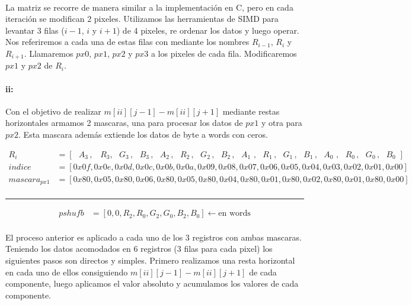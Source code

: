 \documentclass[a4paper]{article}
\begin{document}
\paragraph{} La matriz se recorre de manera similar a la implementaci\'on en C, pero en cada iteraci\'on se modifican 2 pixeles. Utilizamos las herramientas de SIMD para levantar 3 filas ($i-1$, $i$ y $i+1$) de 4 pixeles, re ordenar los datos y luego operar. Nos referiremos a cada una de estas filas con mediante los nombres $R_{i-1}$, $R_i$ y $R_{i+1}$. Llamaremos $px0$, $px1$, $px2$ y $px3$ a los pixeles de cada fila. Modificaremos $px1$ y $px2$ de $R_i$.

\paragraph{ii:} Con el objetivo de realizar $m[ii][j-1] - m[ii][j+1]$ mediante restas horizontales armamos 2 mascaras, una para procesar los datos de $px1$ y otra para $px2$. Esta mascara adem\'as extiende los datos de byte a words con ceros.
 


\begin{align*}
	R_i &= [\, \, \, \, A_3 \, ,\, \, \, \, \, R_3 ,\, \, \, \, G_3 \, ,\, \, \, \, B_3 \, ,\, \, \, \, A_2 \, ,\, \, \, \, R_2 \, ,\, \, \, \, G_2 \, ,\, \, \, \, B_2 \, , \, \, \, \,  A_1 \, \, , \, \, \, \, R_1 \, , \, \, \, \, G_1 \, , \, \, \, \, B_1 \, , \, \, \, \, A_0 \, \, , \, \, \, \, R_0 \, , \, \, \, \, G_0 \, , \, \, \, \, B_0 \, \,]\\
	indice &= [0x0f, 0x0e, 0x0d, 0x0c, 0x0b, 0x0a, 0x09, 0x08, 0x07, 0x06, 0x05, 0x04, 0x03, 0x02, 0x01, 0x00]\\
	mascara_{px1} &= [0x80, 0x05, 0x80, 0x06, 0x80, 0x05, 0x80, 0x04, 0x80, 0x01, 0x80, 0x02, 0x80, 0x01, 0x80, 0x00] \\
\end{align*}
\hrule
\begin{align*}
	pshufb &= [0, 0, R_2, R_0, G_2, G_0, B_2, B_0] \leftarrow \text{en words}
\end{align*} 

\paragraph{} El proceso anterior es aplicado a cada uno de los 3 registros con ambas mascaras. Teniendo los datos acomodados en 6 registros (3 filas para cada pixel) los siguientes pasos son directos y simples. Primero realizamos una resta horizontal en cada uno de ellos consiguiendo $m[ii][j-1] - m[ii][j+1]$ de cada componente, luego aplicamos el valor absoluto y acumulamos los valores de cada componente.
\end{document}
